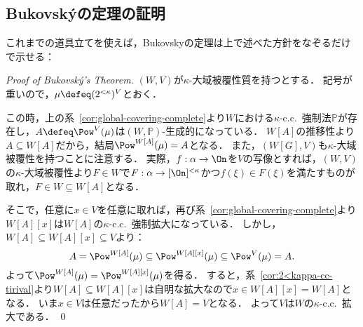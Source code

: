 \documentclass[a4j,leqno]{ltjsarticle}
\newcommand{\cc}{c.c.\ }
\begin{document}
\subsection{Bukovsk\'{y}の定理の証明}
これまでの道具立てを使えば，Bukovskyの定理は上で述べた方針をなぞるだけで示せる：
\begin{proof}[Proof of Bukovsk\'{y}'s Theorem]
 $(W, V)$が$\kappa$-大域被覆性質を持つとする．
 記号が重いので，$\mu \defeq (2^{<\kappa})^V$とおく．

 この時，上の系~\ref{cor:global-covering-complete}より$W$における$\kappa$-\cc{}強制法$\mathbb{P}$が存在し，$A \defeq \Pow^V(\mu)$は$(W, \mathbb{P})$-生成的になっている．
 $W[A]$の推移性より$A \subseteq W[A]$だから，結局$\Pow^{W[A]}(\mu) = A$となる．
 また，$(W[G], V)$も$\kappa$-大域被覆性を持つことに注意する．
 実際，$f: \alpha \to \On$を$V$の写像とすれば，$(W, V)$の$\kappa$-大域被覆性より$F \in W$で$F: \alpha \to [\On]^{<\kappa}$かつ$f(\xi) \in F(\xi)$を満たすものが取れ，$F \in W \subseteq W[A]$となる．

 そこで，任意に$x \in V$を任意に取れば，再び系~\ref{cor:global-covering-complete}より$W[A][x]$は$W[A]$の$\kappa$-\cc{}強制拡大になっている．
 しかし，$W[A] \subseteq W[A][x] \subseteq V$より：
 \[
 A = \Pow^{W[A]}(\mu) \subseteq \Pow^{W[A][x]}(\mu)  \subseteq \Pow^V(\mu) = A.
 \]
 よって$\Pow^{W[A]}(\mu) = \Pow^{W[A][x]}(\mu)$を得る．
 すると，系~\ref{cor:2<kappa-cc-tirival}より$W[A] \subseteq W[A][x]$は自明な拡大なので$x \in W[A][x] = W[A]$となる．
 いま$x \in V$は任意だったから$W[A] = V$となる．
 よって$V$は$W$の$\kappa$-\cc{}拡大である． \qed
\end{proof}


\end{document}
